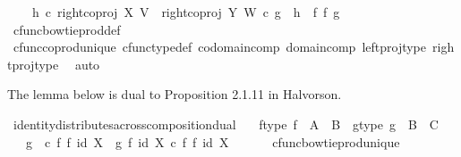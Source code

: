 \begin{isabellebody}
\ \ \ \ h\ {\isasymcirc}\isactrlsub c\ right{\isacharunderscore}{\kern0pt}coproj\ X\ V\ {\isacharequal}{\kern0pt}\ right{\isacharunderscore}{\kern0pt}coproj\ Y\ W\ {\isasymcirc}\isactrlsub c\ g\ {\isasymLongrightarrow}\ h\ {\isacharequal}{\kern0pt}\ f\ {\isasymbowtie}\isactrlsub f\ g{\isachardoublequoteclose}\isanewline
%
\isadelimproof
\ \ %
\endisadelimproof
%
\isatagproof
{}\isamarkupfalse%
\ cfunc{\isacharunderscore}{\kern0pt}bowtie{\isacharunderscore}{\kern0pt}prod{\isacharunderscore}{\kern0pt}def\isanewline
\ \ \isamarkupfalse%
\ cfunc{\isacharunderscore}{\kern0pt}coprod{\isacharunderscore}{\kern0pt}unique\ cfunc{\isacharunderscore}{\kern0pt}type{\isacharunderscore}{\kern0pt}def\ codomain{\isacharunderscore}{\kern0pt}comp\ domain{\isacharunderscore}{\kern0pt}comp\ left{\isacharunderscore}{\kern0pt}proj{\isacharunderscore}{\kern0pt}type\ right{\isacharunderscore}{\kern0pt}proj{\isacharunderscore}{\kern0pt}type\ \isamarkupfalse%
\ auto%
\endisatagproof
{\isafoldproof}%
%
\isadelimproof
%
\endisadelimproof
%
\begin{isamarkuptext}%
The lemma below is dual to Proposition 2.1.11 in Halvorson.%
\end{isamarkuptext}\isamarkuptrue%
\isamarkupfalse%
\ identity{\isacharunderscore}{\kern0pt}distributes{\isacharunderscore}{\kern0pt}across{\isacharunderscore}{\kern0pt}composition{\isacharunderscore}{\kern0pt}dual{\isacharcolon}{\kern0pt}\isanewline
\ \ \ f{\isacharunderscore}{\kern0pt}type{\isacharcolon}{\kern0pt}\ {\isachardoublequoteopen}f\ {\isacharcolon}{\kern0pt}\ A\ {\isasymrightarrow}\ B{\isachardoublequoteclose}\ \ g{\isacharunderscore}{\kern0pt}type{\isacharcolon}{\kern0pt}\ {\isachardoublequoteopen}g\ {\isacharcolon}{\kern0pt}\ B\ {\isasymrightarrow}\ C{\isachardoublequoteclose}\isanewline
\ \ \ {\isachardoublequoteopen}{\isacharparenleft}{\kern0pt}g\ \ {\isasymcirc}\isactrlsub c\ f{\isacharparenright}{\kern0pt}\ {\isasymbowtie}\isactrlsub f\ id\ X\ {\isacharequal}{\kern0pt}\ {\isacharparenleft}{\kern0pt}g\ {\isasymbowtie}\isactrlsub f\ id\ X{\isacharparenright}{\kern0pt}\ {\isasymcirc}\isactrlsub c\ {\isacharparenleft}{\kern0pt}f\ {\isasymbowtie}\isactrlsub f\ id\ X{\isacharparenright}{\kern0pt}{\isachardoublequoteclose}\isanewline
%
\isadelimproof
%
\endisadelimproof
%
\isatagproof
{}\isamarkupfalse%
\ {\isacharminus}{\kern0pt}\ \isanewline
\ \ \isamarkupfalse%
\ cfunc{\isacharunderscore}{\kern0pt}bowtie{\isacharunderscore}{\kern0pt}prod{\isacharunderscore}{\kern0pt}unique\isanewline

\end{isabellebody}
